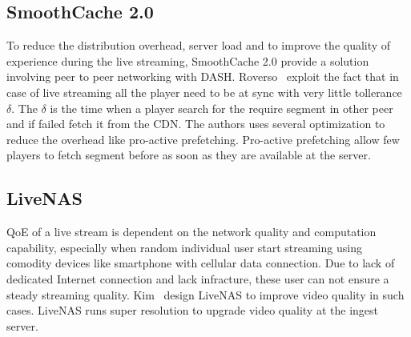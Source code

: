 \subsection{SmoothCache 2.0}
To reduce the distribution overhead, server load and to improve the quality of experience during the live streaming, SmoothCache 2.0\cite{10.1145/2713168.2713182} provide a solution involving peer to peer networking with DASH. Roverso \etal\ exploit the fact that in case of live streaming all the player need to be at sync with very little tollerance $\delta$. The $\delta$ is the time when a player search for the require segment in other peer and if failed fetch it from the CDN. The authors uses several optimization to reduce the overhead like pro-active prefetching. Pro-active prefetching allow few players to fetch segment before as soon as they are available at the server.

\subsection{LiveNAS}
QoE of a live stream is dependent on the network quality and computation capability, especially when random individual user start streaming using comodity devices like smartphone with cellular data connection. Due to lack of dedicated Internet connection and lack infracture, these user can not ensure a steady streaming quality. Kim \etal\ design LiveNAS\cite{10.1145/3387514.3405856} to improve video quality in such cases. LiveNAS runs super resolution to upgrade video quality at the ingest server.

